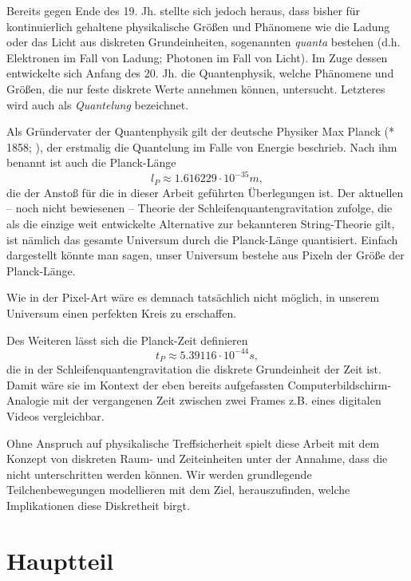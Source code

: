 \documentclass[a4paper,12pt,ngerman]{scrartcl}
\theoremstyle{plain}
\theoremstyle{plain}
\theoremstyle{plain}
\theoremstyle{plain}
\begin{document}
Bereits gegen Ende des 19. Jh. stellte sich jedoch heraus, dass bisher für kontinuierlich gehaltene physikalische Größen und Phänomene wie die Ladung oder das Licht aus diskreten Grundeinheiten, sogenannten \textit{quanta} bestehen (d.h. Elektronen im Fall von Ladung; Photonen im Fall von Licht). Im Zuge dessen entwickelte sich Anfang des 20. Jh. die Quantenphysik, welche Phänomene und Größen, die nur feste diskrete Werte annehmen können, untersucht. Letzteres wird auch als \textit{Quantelung} bezeichnet.

Als Gründervater der Quantenphysik gilt der deutsche Physiker Max Planck (* 1858; ), der erstmalig die Quantelung im Falle von Energie beschrieb. Nach ihm benannt ist auch die Planck-Länge
\[ l_P \approx 1.616 229 \cdot 10^{-35}m,\]
die der Anstoß für die in dieser Arbeit geführten Überlegungen ist. Der aktuellen -- noch nicht bewiesenen -- Theorie der Schleifenquantengravitation zufolge, die als die einzige weit entwickelte Alternative zur bekannteren String-Theorie gilt, ist nämlich das gesamte Universum durch die Planck-Länge quantisiert. Einfach dargestellt könnte man sagen, unser Universum bestehe aus Pixeln der Größe der Planck-Länge.

Wie in der Pixel-Art wäre es demnach tatsächlich nicht möglich, in unserem Universum einen perfekten Kreis zu erschaffen. 

Des Weiteren lässt sich die Planck-Zeit definieren
\[t_P \approx 5.39116\cdot 10^{-44}s,\]
die in der Schleifenquantengravitation die diskrete Grundeinheit der Zeit ist. Damit wäre sie im Kontext der eben bereits aufgefassten Computerbildschirm-Analogie mit der vergangenen Zeit zwischen zwei Frames z.B. eines digitalen Videos vergleichbar. 

Ohne Anspruch auf physikalische Treffsicherheit spielt diese Arbeit mit dem Konzept von diskreten Raum- und Zeiteinheiten unter der Annahme, dass die nicht unterschritten werden können. Wir werden grundlegende Teilchenbewegungen modellieren mit dem Ziel, herauszufinden, welche Implikationen diese Diskretheit birgt. 




\section{Hauptteil}
\end{document}
